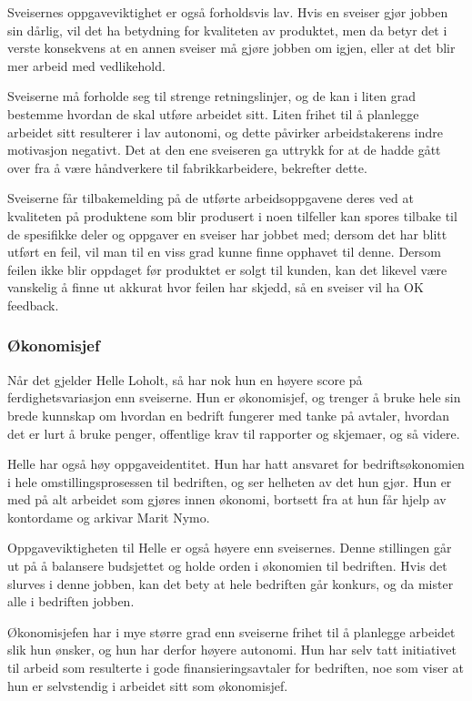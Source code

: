 Sveisernes oppgaveviktighet er også forholdsvis lav. Hvis en sveiser gjør jobben sin dårlig, vil det ha betydning for kvaliteten av produktet, men da betyr det i verste konsekvens at en annen sveiser må gjøre jobben om igjen, eller at det blir mer arbeid med vedlikehold.

Sveiserne må forholde seg til strenge retningslinjer, og de kan i liten grad bestemme hvordan de skal utføre arbeidet sitt. Liten frihet til å planlegge arbeidet sitt resulterer i lav autonomi, og dette påvirker arbeidstakerens indre motivasjon negativt. Det at den ene sveiseren ga uttrykk for at de hadde gått over fra å være håndverkere til fabrikkarbeidere, bekrefter dette.

Sveiserne får tilbakemelding på de utførte arbeidsoppgavene deres ved at kvaliteten på produktene som blir produsert i noen tilfeller kan spores tilbake til de spesifikke deler og oppgaver en sveiser har jobbet med; dersom det har blitt utført en feil, vil man til en viss grad kunne finne opphavet til denne. Dersom feilen ikke blir oppdaget før produktet er solgt til kunden, kan det likevel være vanskelig å finne ut akkurat hvor feilen har skjedd, så en sveiser vil ha OK feedback.

\subsubsection{Økonomisjef}
Når det gjelder Helle Loholt, så har nok hun en høyere score på ferdighetsvariasjon enn sveiserne. Hun er økonomisjef, og trenger å bruke hele sin brede kunnskap om hvordan en bedrift fungerer med tanke på avtaler, hvordan det er lurt å bruke penger, offentlige krav til rapporter og skjemaer, og så videre.

Helle har også høy oppgaveidentitet. Hun har hatt ansvaret for bedriftsøkonomien i hele omstillingsprosessen til bedriften, og ser helheten av det hun gjør. Hun er med på alt arbeidet som gjøres innen økonomi, bortsett fra at hun får hjelp av kontordame og arkivar Marit Nymo.

Oppgaveviktigheten til Helle er også høyere enn sveisernes. Denne stillingen går ut på å balansere budsjettet og holde orden i økonomien til bedriften. Hvis det slurves i denne jobben, kan det bety at hele bedriften går konkurs, og da mister alle i bedriften jobben.

Økonomisjefen har i mye større grad enn sveiserne frihet til å planlegge arbeidet slik hun ønsker, og hun har derfor høyere autonomi. Hun har selv tatt initiativet til arbeid som resulterte i gode finansieringsavtaler for bedriften, noe som viser at hun er selvstendig i arbeidet sitt som økonomisjef.

